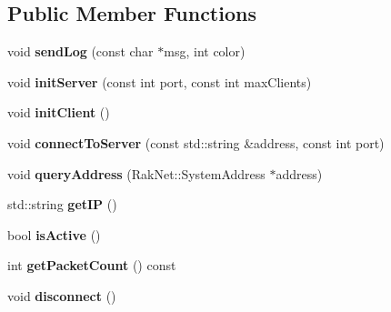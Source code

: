 \subsection*{Public Member Functions}
\begin{DoxyCompactItemize}
\item 
\hypertarget{class_champ_net_1_1_network_a3d25e6581e6a53201de1f68ed266724e}{void {\bfseries send\-Log} (const char $\ast$msg, int color)}\label{class_champ_net_1_1_network_a3d25e6581e6a53201de1f68ed266724e}

\item 
\hypertarget{class_champ_net_1_1_network_ac0d53751c94ef1df4cee9ce3719432bf}{void {\bfseries init\-Server} (const int port, const int max\-Clients)}\label{class_champ_net_1_1_network_ac0d53751c94ef1df4cee9ce3719432bf}

\item 
\hypertarget{class_champ_net_1_1_network_af7bda654a247a00e46d6adcc87c8d65b}{void {\bfseries init\-Client} ()}\label{class_champ_net_1_1_network_af7bda654a247a00e46d6adcc87c8d65b}

\item 
\hypertarget{class_champ_net_1_1_network_a9dbfd1e6e9e5f11720a6e8e41174df1e}{void {\bfseries connect\-To\-Server} (const std\-::string \&address, const int port)}\label{class_champ_net_1_1_network_a9dbfd1e6e9e5f11720a6e8e41174df1e}

\item 
\hypertarget{class_champ_net_1_1_network_a9cde161aafa694e5fef8d1c3fac3edd3}{void {\bfseries query\-Address} (Rak\-Net\-::\-System\-Address $\ast$address)}\label{class_champ_net_1_1_network_a9cde161aafa694e5fef8d1c3fac3edd3}

\item 
\hypertarget{class_champ_net_1_1_network_a29734a6ba6ab488fc9ed9278ae7239d9}{std\-::string {\bfseries get\-I\-P} ()}\label{class_champ_net_1_1_network_a29734a6ba6ab488fc9ed9278ae7239d9}

\item 
\hypertarget{class_champ_net_1_1_network_a2266d0ef6af69462b1594246cea5b95d}{bool {\bfseries is\-Active} ()}\label{class_champ_net_1_1_network_a2266d0ef6af69462b1594246cea5b95d}

\item 
\hypertarget{class_champ_net_1_1_network_a29e2e816288fb30919547e221d2414bf}{int {\bfseries get\-Packet\-Count} () const }\label{class_champ_net_1_1_network_a29e2e816288fb30919547e221d2414bf}

\item 
\hypertarget{class_champ_net_1_1_network_a6d06699d228d77aff9c358f79c76ed56}{void {\bfseries disconnect} ()}\label{class_champ_net_1_1_network_a6d06699d228d77aff9c358f79c76ed56}


\end{DoxyCompactItemize}
